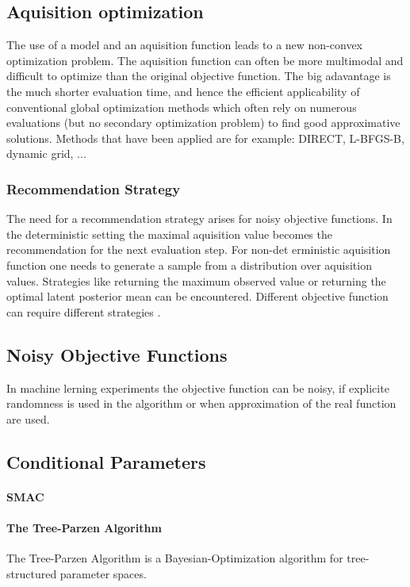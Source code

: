 \documentclass[english]{article}
\begin{document}
\subsection*{Aquisition optimization}
The use of a model and an aquisition function leads to a new non-convex optimization problem. The aquisition function can often be more multimodal and difficult to optimize than the original objective function. The big adavantage is the much shorter evaluation time, and hence the efficient applicability of conventional global optimization methods which often rely on numerous evaluations (but no secondary optimization problem) to find good approximative solutions.
Methods that have been applied are for example: DIRECT, L-BFGS-B, dynamic grid, ...

\subsubsection*{Recommendation Strategy}
The need for a recommendation strategy arises for noisy objective functions. In the deterministic setting the maximal aquisition value becomes the recommendation for the next evaluation step. For non-det erministic aquisition function one needs to generate a sample from a distribution over aquisition values. Strategies like returning the maximum observed value or returning the optimal latent posterior mean can be encountered. Different objective function can require different strategies \cite{hoffman_modular_2014}.

\subsection{Noisy Objective Functions}
In machine lerning experiments the objective function can be noisy, if explicite randomness is used in the algorithm or when approximation of the real function are used.
\subsection{Conditional Parameters}

\paragraph{SMAC}

\paragraph{The Tree-Parzen Algorithm}
The Tree-Parzen Algorithm \cite{bergstra_algorithms_2011} is a Bayesian-Optimization algorithm for tree-structured parameter spaces.
\end{document}
